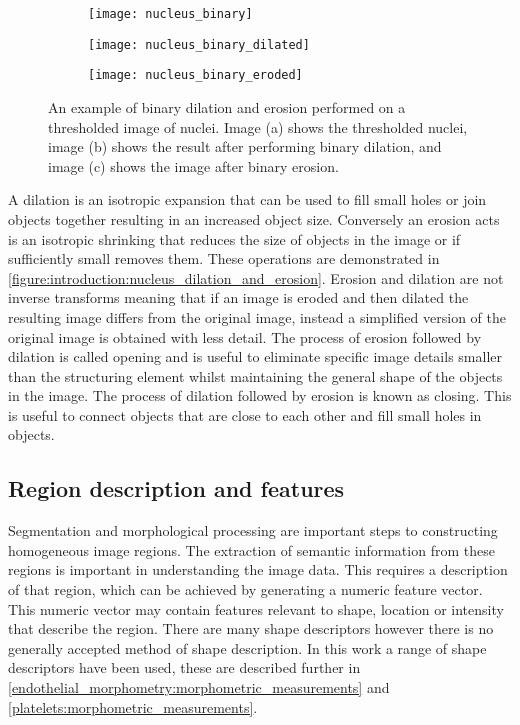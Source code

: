 \begin{figure}[htbp!]\centering
	\begin{subfigure}[b]{0.32\linewidth}
		\centering
		\texttt{[image: nucleus\_binary]}
		\caption{}
		\label{figure:introduction:nucleus_binary}
	\end{subfigure}
	\begin{subfigure}[b]{0.32\linewidth}
		\centering
		\texttt{[image: nucleus\_binary\_dilated]}
		\caption{}
		\label{figure:introduction:nucleus_dilated}
	\end{subfigure}
	\begin{subfigure}[b]{0.32\linewidth}
		\centering
		\texttt{[image: nucleus\_binary\_eroded]}
		\caption{}
		\label{figure:introduction:nucleus_erosion}
	\end{subfigure}
\caption[Binary dilation and erosion]{An example of binary dilation and erosion performed on a thresholded image of nuclei. Image (a) shows the thresholded nuclei, image (b) shows the result after performing binary dilation, and image (c) shows the image after binary erosion.}
\label{figure:introduction:nucleus_dilation_and_erosion}
\end{figure}

A dilation is an isotropic expansion that can be used to fill small holes or join objects together resulting in an increased object size. Conversely an erosion acts is an isotropic shrinking that reduces the size of objects in the image or if sufficiently small removes them. These operations are demonstrated in \autoref{figure:introduction:nucleus_dilation_and_erosion}. Erosion and dilation are not inverse transforms meaning that if an image is eroded and then dilated the resulting image differs from the original image, instead a simplified version of the original image is obtained with less detail. The process of erosion followed by dilation is called opening and is useful to eliminate specific image details smaller than the structuring element whilst maintaining the general shape of the objects in the image. The process of dilation followed by erosion is known as closing. This is useful to connect objects that are close to each other and fill small holes in objects.

\subsection{Region description and features}
\label{introduction:image_processing:morphological_processing}
Segmentation and morphological processing are important steps to constructing homogeneous image regions. The extraction of semantic information from these regions is important in understanding the image data. This requires a description of that region, which can be achieved by generating a numeric feature vector. This numeric vector may contain features relevant to shape, location or intensity that describe the region. There are many shape descriptors however there is no generally accepted method of shape description. In this work a range of shape descriptors have been used, these are described further in \autoref{endothelial_morphometry:morphometric_measurements} and \autoref{platelets:morphometric_measurements}.

